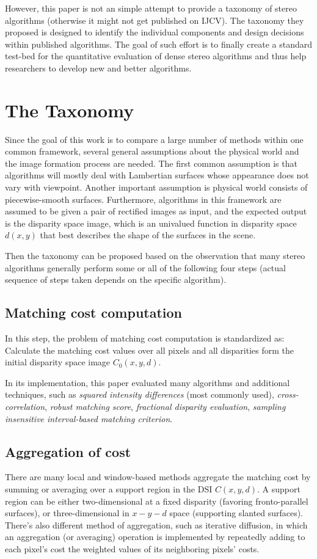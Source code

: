 \documentclass[10pt,twocolumn,letterpaper]{article}
\begin{document}
However, this paper is not an simple attempt to provide a taxonomy of stereo algorithms 
(otherwise it might not get published on IJCV).
The taxonomy they proposed is designed to identify the individual components 
and design decisions within published algorithms. 
The goal of such effort is to finally create a standard test-bed 
for the quantitative evaluation of dense stereo algorithms and 
thus help researchers to develop new and better algorithms.
\section{The Taxonomy}
Since the goal of this work is to compare a large number of methods within one common framework,
several general assumptions about the physical world and the
image formation process are needed. The first common
assumption is that algorithms will mostly deal with Lambertian surfaces whose appearance does not vary with
viewpoint. Another important assumption is physical world consists of piecewise-smooth surfaces.
Furthermore, algorithms in this framework are assumed to be given 
a pair of rectified images as input, and the expected output is the disparity space
image, which is an univalued function in disparity
space $d(x, y)$ that best describes the shape of the surfaces in the scene.

Then the taxonomy can be proposed based on the observation that 
many stereo algorithms generally perform some or all of the following four steps 
(actual sequence of steps taken depends on the specific algorithm).
\subsection{Matching cost computation}
In this step, the problem of matching cost computation is standardized as:
Calculate the matching cost values over all pixels and 
all disparities form the initial disparity space image
${C}_{0}(x, y, d)$. 

In its implementation, this paper evaluated many algorithms and additional
techniques, such as 
{\em squared intensity differences} (most commonly used), 
{\em cross-correlation}, 
{\em robust matching score}, 
{\em fractional disparity evaluation}, 
{\em sampling insensitive interval-based matching criterion}.
\subsection{Aggregation of cost}
There are many local and window-based methods 
aggregate the matching cost by summing or averaging over a
support region in the DSI $C(x, y, d)$. 
A support region can be either two-dimensional at a fixed
disparity (favoring fronto-parallel surfaces), 
or three-dimensional in $x-y-d$ space (supporting slanted
surfaces).
There's also different method of aggregation, such as 
iterative diffusion, in which an aggregation (or averaging) operation
is implemented by repeatedly adding to each pixel's cost 
the weighted values of its neighboring
pixels' costs.
\end{document}

